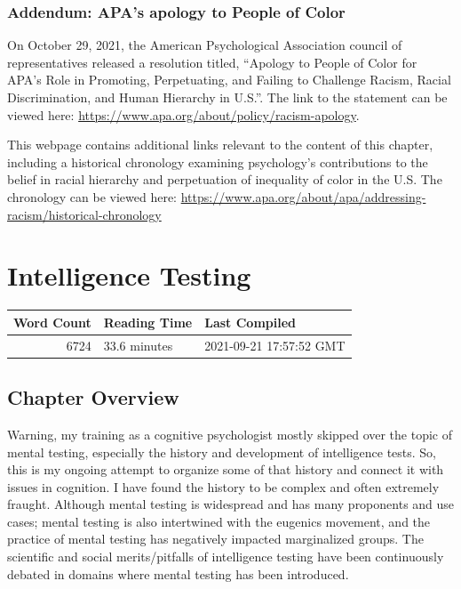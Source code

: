\documentclass[
  oneside,
  12pt]{crumpbook}
\begin{document}
\hypertarget{addendum-apas-apology-to-people-of-color}{%
\subsection{Addendum: APA's apology to People of Color}\label{addendum-apas-apology-to-people-of-color}}

On October 29, 2021, the American Psychological Association council of representatives released a resolution titled, ``Apology to People of Color for APA's Role in Promoting, Perpetuating, and Failing to Challenge Racism, Racial Discrimination, and Human Hierarchy in U.S.''. The link to the statement can be viewed here: \url{https://www.apa.org/about/policy/racism-apology}.

This webpage contains additional links relevant to the content of this chapter, including a historical chronology examining psychology's contributions to the belief in racial hierarchy and perpetuation of inequality of color in the U.S. The chronology can be viewed here: \url{https://www.apa.org/about/apa/addressing-racism/historical-chronology}

\hypertarget{intelligence-testing}{%
\chapter{Intelligence Testing}\label{intelligence-testing}}

\begin{tabular}{r|l|l}
\hline
Word Count & Reading Time & Last Compiled\\
\hline
6724 & 33.6 minutes & 2021-09-21 17:57:52 GMT\\
\hline
\end{tabular}

\hypertarget{chapter-overview-3}{%
\section{Chapter Overview}\label{chapter-overview-3}}

Warning, my training as a cognitive psychologist mostly skipped over the topic of mental testing, especially the history and development of intelligence tests. So, this is my ongoing attempt to organize some of that history and connect it with issues in cognition. I have found the history to be complex and often extremely fraught. Although mental testing is widespread and has many proponents and use cases; mental testing is also intertwined with the eugenics movement, and the practice of mental testing has negatively impacted marginalized groups. The scientific and social merits/pitfalls of intelligence testing have been continuously debated in domains where mental testing has been introduced.
\end{document}
